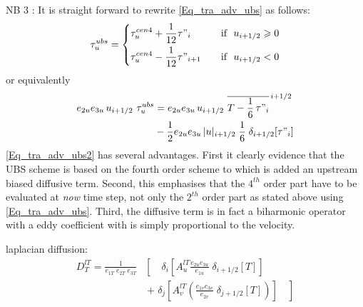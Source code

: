 NB 3 : It is straight forward to rewrite \eqref{Eq_tra_adv_ubs} as follows:
\begin{equation} \label{Eq_tra_adv_ubs2}
\tau _u^{ubs} = \left\{	 \begin{aligned}
	& \tau _u^{cen4} + \frac{1}{12} \tau"_i		& \quad \text{if }\ u_{i+1/2} \geqslant 0 \\
	& \tau _u^{cen4} - \frac{1}{12} \tau"_{i+1}	& \quad \text{if }\ u_{i+1/2}       <       0
  						 \end{aligned}    \right.
\end{equation}
or equivalently 
\begin{equation} \label{Eq_tra_adv_ubs2}
\begin{split}
e_{2u} e_{3u}\,u_{i+1/2} \ \tau _u^{ubs} 
&= e_{2u} e_{3u}\,u_{i+1/2} \ \overline{ T - \frac{1}{6}\,\tau"_i }^{\,i+1/2} \\
& - \frac{1}{2} e_{2u} e_{3u}\,|u|_{i+1/2} \;\frac{1}{6} \;\delta_{i+1/2}[\tau"_i]
\end{split}
\end{equation}
\eqref{Eq_tra_adv_ubs2} has several advantages. First it clearly evidence that 
the UBS scheme is based on the fourth order scheme to which is added an 
upstream biased diffusive term. Second, this emphasises that the $4^{th}$ order 
part have to be evaluated at \emph{now} time step, not only the $2^{th}$ order 
part as stated above using \eqref{Eq_tra_adv_ubs}. Third, the diffusive term is 
in fact a biharmonic operator with a eddy coefficient with is simply proportional 
to the velocity.

laplacian diffusion:
\begin{equation} \label{Eq_tra_ldf_lap}
\begin{split}
D_T^{lT} =\frac{1}{e_{1T} \; e_{2T}\;  e_{3T} } &\left[ {\quad \delta _i 
\left[ {A_u^{lT} \frac{e_{2u} e_{3u} }{e_{1u} }\;\delta _{i+1/2} 
\left[ T \right]} \right]} \right.
\\
&\ \left. {+\; \delta _j \left[ 
{A_v^{lT} \left( {\frac{e_{1v} e_{3v} }{e_{2v} }\;\delta _{j+1/2} \left[ T 
\right]} \right)} \right]\quad } \right]
\end{split}
\end{equation}

